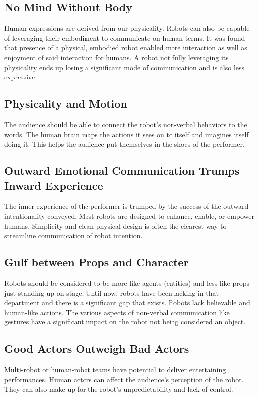 \subsection{No Mind Without Body}
Human expressions are derived from our physicality. Robots can also be capable of leveraging their embodiment to communicate on human terms. It was found that presence of a physical, embodied robot enabled more interaction as well as enjoyment of said interaction for humans. A robot not fully leveraging its physicality ends up losing a significant mode of communication and is also less expressive.

\subsection{Physicality and Motion}
The audience should be able to connect the robot's non-verbal behaviors to the words. The human brain maps the actions it sees on to itself and imagines itself doing it. This helps the audience put themselves in the shoes of the performer.

\subsection{Outward Emotional Communication Trumps Inward Experience}
The inner experience of the performer is trumped by the success of the outward intentionality conveyed. Most robots are designed to enhance, enable, or empower humans. Simplicity and clean physical design is often the clearest way to streamline communication of robot intention.

\subsection{Gulf between Props and Character}
Robots should be considered to be more like agents (entities) and less like props just standing up on stage. Until now, robots have been lacking in that department and there is a significant gap that exists. Robots lack believable and human-like actions. The various aspects of non-verbal communication like gestures have a significant impact on the robot not being considered an object.

\subsection{Good Actors Outweigh Bad Actors}
Multi-robot or human-robot teams have potential to deliver entertaining performances. Human actors can affect the audience's perception of the robot. They can also make up for the robot's unpredictability and lack of control.

